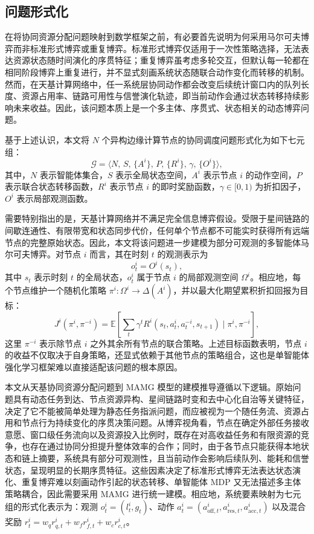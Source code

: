 \subsection{问题形式化}

在将协同资源分配问题映射到数学框架之前，有必要首先说明为何采用马尔可夫博弈而非标准形式博弈或重复博弈。标准形式博弈仅适用于一次性策略选择，无法表达资源状态随时间演化的序贯特征；重复博弈虽考虑多轮交互，但默认每一轮都在相同阶段博弈上重复进行，并不显式刻画系统状态随联合动作变化而转移的机制。然而，在天基计算网络中，任一系统层协同动作都会改变后续统计窗口内的队列长度、资源占用率、链路可用性与信誉演化轨迹，即当前动作会通过状态转移持续影响未来收益。因此，该问题本质上是一个多主体、序贯式、状态相关的动态博弈问题。

基于上述认识，本文将 $N$ 个异构边缘计算节点的协同调度问题形式化为如下七元组：
\begin{equation}
    \mathcal{G}=\langle N,\,S,\,\{A^i\},\,P,\,\{R^i\},\,\gamma,\,\{O^i\}\rangle,
    \label{eq:ch4_markov_game}
\end{equation}
其中，$N$ 表示智能体集合，$S$ 表示全局状态空间，$A^i$ 表示节点 $i$ 的动作空间，$P$ 表示联合状态转移函数，$R^i$ 表示节点 $i$ 的即时奖励函数，$\gamma\in[0,1)$ 为折扣因子，$O^i$ 表示局部观测函数。

需要特别指出的是，天基计算网络并不满足完全信息博弈假设。受限于星间链路的间歇连通性、有限带宽和状态同步代价，任何单个节点都不可能实时获得所有远端节点的完整原始状态。因此，本文将该问题进一步建模为部分可观测的多智能体马尔可夫博弈。对节点 $i$ 而言，其在时刻 $t$ 的观测表示为
\begin{equation}
    o_t^i = O^i(s_t),
    \label{eq:ch4_obs_func}
\end{equation}
其中 $s_t$ 表示时刻 $t$ 的全局状态，$o_t^i$ 属于节点 $i$ 的局部观测空间 $\Omega^i$。相应地，每个节点维护一个随机化策略 $\pi^i:\Omega^i\to \Delta(A^i)$，并以最大化期望累积折扣回报为目标：
\begin{equation}
    J^i(\pi^i,\pi^{-i})=\mathbb{E}\!\left[\sum_t\gamma^t R^i\!\left(s_t,a_t^i,a_t^{-i},s_{t+1}\right)\mid \pi^i,\pi^{-i}\right],
    \label{eq:ch4_return}
\end{equation}
这里 $\pi^{-i}$ 表示除节点 $i$ 之外其余所有节点的联合策略。上述目标函数表明，节点 $i$ 的收益不仅取决于自身策略，还显式依赖于其他节点的策略组合，这也是单智能体强化学习框架难以直接适配该问题的根本原因。

本文从天基协同资源分配问题到 MAMG 模型的建模推导遵循以下逻辑。原始问题具有动态任务到达、节点资源异构、星间链路时变和去中心化自治等关键特征，决定了它不能被简单处理为静态任务指派问题，而应被视为一个随任务流、资源占用和节点行为持续变化的序贯决策问题。从博弈视角看，节点在确定外部任务接收意愿、窗口级任务流向以及资源投入比例时，既存在对高收益任务和有限资源的竞争，也存在通过协同分担提升整体效率的合作；同时，由于各节点只能获得本地状态和链上摘要，系统具有部分可观测性，且当前动作会影响后续队列、能耗和信誉状态，呈现明显的长期序贯特征。这些因素决定了标准形式博弈无法表达状态演化、重复博弈难以刻画动作引起的状态转移、单智能体 MDP 又无法描述多主体策略耦合，因此需要采用 MAMG 进行统一建模。相应地，系统要素映射为七元组的形式化表示为：观测 $o_t^i=(l_t^i,g_t)$、动作 $a_t^i=(a_{\mathrm{off},t}^i,a_{\mathrm{res},t}^i,a_{\mathrm{acc},t}^i)$ 以及混合奖励 $r_t^i=w_q r_{q,t}^i+w_f r_{f,t}^i+w_c r_{c,t}^i$。

